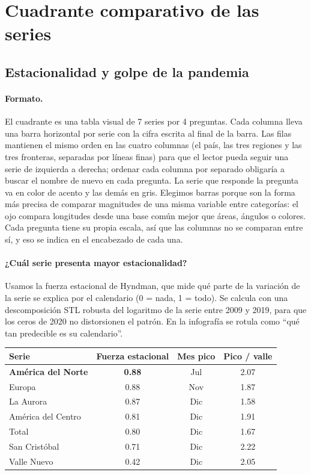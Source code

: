 \section{Cuadrante comparativo de las series}

\subsection{Estacionalidad y golpe de la pandemia}

\paragraph{Formato.} El cuadrante es una tabla visual de 7 series por 4 preguntas.
Cada columna lleva una barra horizontal por serie con la cifra escrita al final de
la barra. Las filas mantienen el mismo orden en las cuatro columnas (el país, las
tres regiones y las tres fronteras, separadas por líneas finas) para que el lector
pueda seguir una serie de izquierda a derecha; ordenar cada columna por separado
obligaría a buscar el nombre de nuevo en cada pregunta. La serie que responde la pregunta va en
color de acento y las demás en gris. Elegimos barras porque son la forma más
precisa de comparar magnitudes de una misma variable entre categorías: el ojo
compara longitudes desde una base común mejor que áreas, ángulos o colores. Cada
pregunta tiene su propia escala, así que las columnas no se comparan entre sí, y
eso se indica en el encabezado de cada una.

\paragraph{¿Cuál serie presenta mayor estacionalidad?} Usamos la fuerza
estacional de Hyndman, que mide qué parte de la variación de la serie se explica
por el calendario (0 = nada, 1 = todo). Se calcula con una descomposición STL
robusta del logaritmo de la serie entre 2009 y 2019, para que los ceros de 2020
no distorsionen el patrón. En la infografía se rotula como ``qué tan predecible
es su calendario''.

\begin{center}
\begin{tabular}{@{}lccc@{}}
\toprule
Serie & Fuerza estacional & Mes pico & Pico / valle \\
\midrule
\textbf{América del Norte} & \textbf{0.88} & Jul & 2.07 \\
Europa                     & 0.88 & Nov & 1.87 \\
La Aurora                  & 0.87 & Dic & 1.58 \\
América del Centro         & 0.81 & Dic & 1.91 \\
Total                      & 0.80 & Dic & 1.67 \\
San Cristóbal              & 0.71 & Dic & 2.22 \\
Valle Nuevo                & 0.42 & Dic & 2.05 \\
\bottomrule
\end{tabular}
\end{center}

